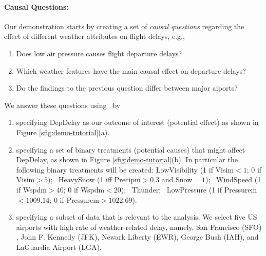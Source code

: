   \paragraph{\bf Causal Questions:} 
Our demonstration starts by creating a set of {\em causal questions} regarding the effect of different weather attributes on flight delays, e.g.,
\begin{enumerate}
  \item Does low air pressure causes flight departure delays?
  \item Which weather features have the main causal effect on departure delays?
  \item Do the findings to the previous question differ between major aiports?
\end{enumerate}
We answer these questions using \GSQL\ by
    \begin{enumerate}
      \item specifying DepDelay as our outcome of interest (potential effect) as shown in Figure \ref{sfig:demo-tutorial}(a).
      \item specifying a set of binary treatments (potential causes) that might affect DepDelay, 
      as shown in Figure \ref{sfig:demo-tutorial}(b). 
      In particular the following binary treatments will be created: LowVisibility (1 if Visim$<1$; 0 if Visim$>5$); \ HeavySnow (1 iff Precipm$>0.3$ and Snow$=1$); \ WindSpeed (1 if Wspdm$>40$; 0 if Wspdm$<20$); \  Thunder; \ LowPressure (1 if Pressurem$<1009.14$; 0 if Pressurem$>1022.69$).

      \item specifying a subset of data that is relevant to the analysis.  We select five US airports  with high rate of weather-related delay, namely, San Francisco (SFO) , John F. Kennedy (JFK), Newark Liberty (EWR), George Bush (IAH), and LaGuardia Airport (LGA).
\end{enumerate}


